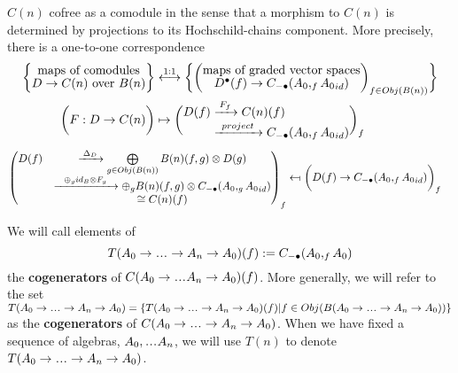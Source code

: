 $C(n)$ cofree as a comodule in the sense that 
a morphism to $C(n)$ is determined by projections
to its Hochschild-chains component.
More precisely, there is a one-to-one correspondence
\begin{equation}\label{eq:quasicofree}
\begin{split}
\bigg\{ \let\scriptstyle\textstyle
\substack{\textrm{maps of comodules}\\
  D \to C(n)\textrm{ over } B(n)}
\bigg\}
&\overset{1:1}\longleftrightarrow
\bigg\{ \bigg( \let\scriptstyle\textstyle
\substack{\textrm{maps of graded vector spaces}\\
  D^\bullet(f) \to C_{-\bullet}(A_0, _f{A_0}_{id})}
\bigg)_{f \in Obj(B(n))} \bigg\}\\
\bigg( F:D\to C(n) \bigg)
&\mapsto
\bigg( \substack{\begin{split}
  D(f) 
  &\xrightarrow{F_f} C(n)(f) \\
  &\xrightarrow{project}
  C_{-\bullet}(A_0, _f{A_0}_{id})
  \end{split}} 
  \bigg)_f
\end{split}
\end{equation}
\begin{align*}  
\begin{pmatrix}
  D(f)
  &\xrightarrow{\Delta_D}
  \bigoplus \limits_{g \in Obj(B(n))}
  B(n)(f,g) \otimes D(g)\\
  &\xrightarrow{\oplus_g id_B \otimes F_g}
  \oplus_g
  B(n)(f,g) \otimes C_{-\bullet}(A_0, _g{A_0}_{id})\\
  &\cong C(n)(f)
  \end{pmatrix} _f
&\leftmapsto  
\bigg( D(f) \to
  C_{-\bullet}(A_0, _f{A_0}_{id})
  \bigg)_f
\end{align*}
%
\begin{defn}\label{def:cogenerators}
We will call elements of 
$$T(A_0 \to \smdots \to A_n \to A_0)(f) :=
C_{-\bullet}(A_0, _f{A_0})$$ 
the \textbf{cogenerators} of 
$C(A_0 \to \smdots A_n \to A_0)(f)$. 
More generally, we will refer to 
the set $T(A_0 \to \smdots \to A_n \to A_0) 
= \{T(A_0 \to \smdots \to A_n \to A_0)(f) | 
f \in Obj(B(A_0 \to \smdots \to A_n \to A_0))\}$ 
as the \textbf{cogenerators} of 
$C(A_0 \to \smdots \to A_n \to A_0)$. When we 
have fixed a sequence of algebras, 
$A_0, \smdots A_n$, we will 
use $T(n)$ to denote 
$T(A_0 \to \smdots \to A_n \to A_0)$.
\end{defn}
%

%
